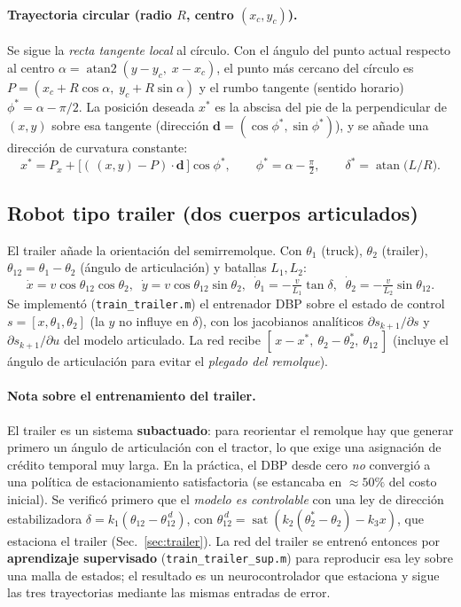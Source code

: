 \documentclass[11pt,a4paper]{article}
\newcommand{\code}[1]{\texttt{\small #1}}
\begin{document}
\paragraph{Trayectoria circular (radio $R$, centro $(x_c,y_c)$).} Se sigue la
\emph{recta tangente local} al círculo. Con el ángulo del punto actual respecto al centro
$\alpha=\operatorname{atan2}(y-y_c,\;x-x_c)$, el punto más cercano del círculo es
$P=(x_c+R\cos\alpha,\;y_c+R\sin\alpha)$ y el rumbo tangente (sentido horario)
$\phi^{*}=\alpha-\pi/2$. La posición deseada $x^{*}$ es la abscisa del pie de la
perpendicular de $(x,y)$ sobre esa tangente (dirección
$\mathbf{d}=(\cos\phi^{*},\sin\phi^{*})$), y se añade una dirección de curvatura constante:
\[
  x^{*}=P_x+\big[(\,(x,y)-P)\cdot\mathbf{d}\,\big]\cos\phi^{*}, \qquad
  \phi^{*}=\alpha-\tfrac{\pi}{2}, \qquad
  \delta^{*}=\operatorname{atan}\!\big(L/R\big) .
\]

\subsection{Robot tipo trailer (dos cuerpos articulados)}
El trailer añade la orientación del semirremolque. Con $\theta_1$ (truck), $\theta_2$
(trailer), $\theta_{12}=\theta_1-\theta_2$ (ángulo de articulación) y batallas
$L_1,L_2$:
\[
  \dot x=v\cos\theta_{12}\cos\theta_2,\;\;
  \dot y=v\cos\theta_{12}\sin\theta_2,\;\;
  \dot\theta_1=-\tfrac{v}{L_1}\tan\delta,\;\;
  \dot\theta_2=-\tfrac{v}{L_2}\sin\theta_{12}.
\]
Se implementó (\code{train\_trailer.m}) el entrenador DBP sobre el estado de control
$s=[x,\theta_1,\theta_2]$ (la $y$ no influye en $\delta$), con los jacobianos analíticos
$\partial s_{k+1}/\partial s$ y $\partial s_{k+1}/\partial u$ del modelo articulado. La
red recibe $[\,x-x^*,\ \theta_2-\theta_2^*,\ \theta_{12}\,]$ (incluye el ángulo de
articulación para evitar el \emph{plegado del remolque}).

\paragraph{Nota sobre el entrenamiento del trailer.} El trailer es un sistema
\textbf{subactuado}: para reorientar el remolque hay que generar primero un ángulo de
articulación con el tractor, lo que exige una asignación de crédito temporal muy larga.
En la práctica, el DBP desde cero \emph{no} convergió a una política de estacionamiento
satisfactoria (se estancaba en $\approx 50\%$ del costo inicial). Se verificó primero que
el \emph{modelo es controlable} con una ley de dirección estabilizadora
$\delta = k_1(\theta_{12}-\theta_{12}^{\,d})$, con
$\theta_{12}^{\,d}=\operatorname{sat}(k_2(\theta_2^*-\theta_2)-k_3 x)$, que estaciona el
trailer (Sec.~\ref{sec:trailer}). La red del trailer se entrenó entonces por
\textbf{aprendizaje supervisado} (\code{train\_trailer\_sup.m}) para reproducir esa ley
sobre una malla de estados; el resultado es un neurocontrolador que estaciona y sigue las
tres trayectorias mediante las mismas entradas de error.
\end{document}
